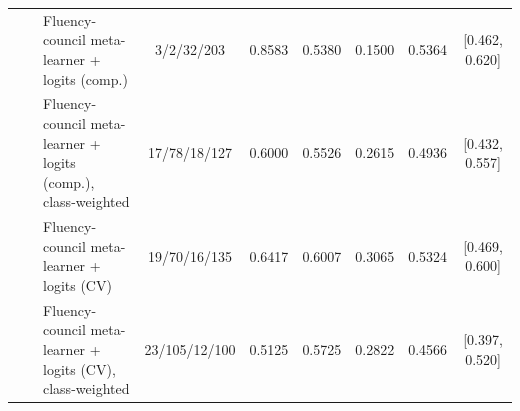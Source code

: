 \begin{tabular}{lllcccccc}
 &  & Fluency-council meta-learner + logits (comp.) & 3/2/32/203 & 0.8583 & 0.5380 & 0.1500 & 0.5364 & [0.462, 0.620] \\
 &  & Fluency-council meta-learner + logits (comp.), class-weighted & 17/78/18/127 & 0.6000 & 0.5526 & 0.2615 & 0.4936 & [0.432, 0.557] \\
 &  & Fluency-council meta-learner + logits (CV) & 19/70/16/135 & 0.6417 & 0.6007 & 0.3065 & 0.5324 & [0.469, 0.600] \\
 &  & Fluency-council meta-learner + logits (CV), class-weighted & 23/105/12/100 & 0.5125 & 0.5725 & 0.2822 & 0.4566 & [0.397, 0.520] \\
\hline
\end{tabular}
